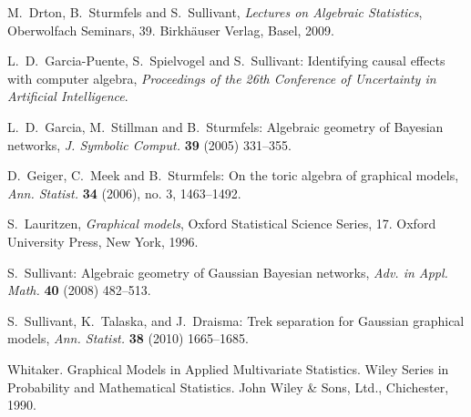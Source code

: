 \documentclass[letterpaper]{article}
\theoremstyle{plain}
\theoremstyle{definition}
\begin{document}
\begin{thebibliography}{20}



M.~Drton, B.~Sturmfels and S.~Sullivant, \emph{Lectures on Algebraic Statistics}, 
Oberwolfach Seminars, 39. Birkh\"auser Verlag, Basel, 2009.



 L.~D.~Garcia-Puente, S.~Spielvogel and S.~Sullivant: Identifying
causal effects with computer algebra, {\em Proceedings of the 26th
Conference of Uncertainty in Artificial Intelligence}.

 L.~D.~Garcia, M.~Stillman and B.~Sturmfels: 
Algebraic geometry of Bayesian networks, {\em J. Symbolic Comput.}
  {\bf 39} (2005) 331--355.
  
D.~Geiger, C.~Meek and B.~Sturmfels: On the toric algebra of graphical
models, {\em Ann. Statist.} {\bf 34} (2006), no. 3, 1463--1492.


S.~Lauritzen,  \emph{Graphical models}, Oxford Statistical Science Series, 17. Oxford University Press, New York, 1996.


 S.~Sullivant: Algebraic geometry of Gaussian Bayesian
  networks, {\em Adv. in Appl. Math.} {\bf 40} (2008) 482--513.

S.~Sullivant, K.~Talaska, and J.~Draisma: Trek separation for Gaussian
graphical models, {\em Ann. Statist.} {\bf 38} (2010) 1665--1685. 



  Whitaker.  Graphical Models in Applied Multivariate
  Statistics. Wiley Series in Probability and Mathematical Statistics. John Wiley \& Sons, Ltd., Chichester, 1990.


\end{thebibliography}
\end{document}
